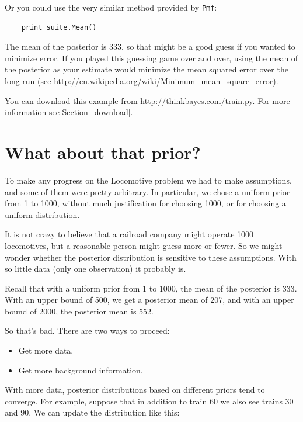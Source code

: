 \documentclass[12pt]{book}
\begin{document}
Or you could use the very similar method provided by {\tt Pmf}:

\begin{verbatim}
    print suite.Mean()
\end{verbatim}

The mean of the posterior is 333, so that might be a
good guess if you wanted to minimize error.  If you played this
guessing game over and over, using the mean of the posterior as your
estimate would minimize the mean squared error over the long run (see
\url{http://en.wikipedia.org/wiki/Minimum_mean_square_error}).

You can download this example from \url{http://thinkbayes.com/train.py}.
  For more information
see Section~\ref{download}.

\section{What about that prior?}

To make any progress on the Locomotive problem we had to make
assumptions, and some of them were pretty arbitrary.  In
particular, we chose a uniform prior from 1 to 1000, without
much justification for choosing 1000, or for choosing a uniform
distribution.

It is not crazy to believe that a railroad company might operate
1000 locomotives, but a reasonable person might guess more or fewer.
So we might wonder whether the posterior distribution is sensitive
to these assumptions.  With so little data (only one observation)
it probably is.

Recall that with a uniform prior from 1 to 1000, the mean of
the posterior is 333.  With an upper bound of 500, we get a
posterior mean of 207, and with an upper bound of 2000,
the posterior mean is 552.

So that's bad.  There are two ways to proceed:

\begin{itemize}

\item Get more data.

\item Get more background information.

\end{itemize}

With more data, posterior distributions based on different
priors tend to converge.  For example, suppose that in addition
to train 60 we also see trains 30 and 90.  We can update the
distribution like this:
\end{document}
